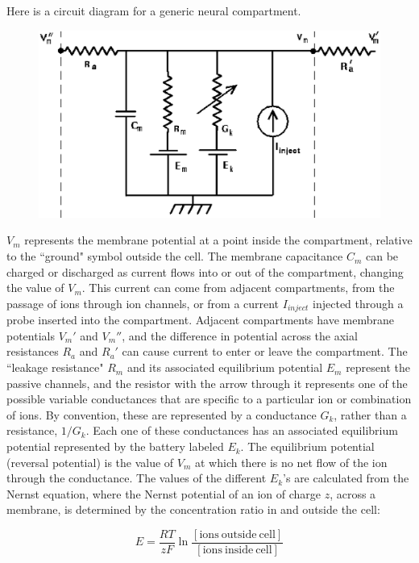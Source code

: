 \documentclass[12pt]{article}
\begin{document}
Here is a circuit diagram for a generic neural compartment.

\begin{figure}[h]
  \centering
 \includegraphics[scale=0.5]{figures/compt.eps}
  \label{fig:compt}
\end{figure}

$V_m$ represents the membrane potential at a point inside the compartment, relative to the ``ground" symbol outside the cell. The membrane capacitance $C_m$ can be charged or discharged as current flows into or out of the compartment, changing the value of $V_m$. This current can come from adjacent compartments, from the passage of ions through ion channels, or from a current $I_{inject}$ injected through a probe inserted into the compartment. Adjacent compartments have membrane potentials $V_m'$ and $V_m''$, and the difference in potential across the axial resistances $R_a$ and $R_a'$ can cause current to enter or leave the compartment. The ``leakage resistance" $R_m$ and its associated equilibrium potential $E_m$ represent the passive channels, and the resistor with the arrow through it represents one of the possible variable conductances that are specific to a particular ion or combination of ions. By convention, these are represented by a conductance $G_k$, rather than a resistance, $1/G_k$. Each one of these conductances has an associated equilibrium potential represented by the battery labeled $E_k$. The equilibrium potential (reversal potential) is the value of $V_m$ at which there is no net flow of the ion through the conductance. The values of the different $E_k$'s are calculated from the Nernst equation, where the Nernst potential of an ion of charge $z$, across a membrane, is determined by the concentration ratio in and outside the cell:

\begin{displaymath}
    E = \frac{R T}{z F} \ln\frac{[\mathrm{ions~outside~cell}]}{[\mathrm{ions~inside~cell}]}
\end{displaymath}
\end{document}
